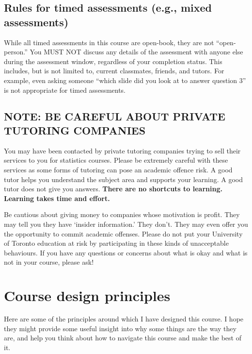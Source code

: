 \documentclass[
  openany]{book}
\begin{document}
\hypertarget{rules-for-timed-assessments-e.g.-mixed-assessments}{%
\subsection{Rules for timed assessments (e.g., mixed assessments)}\label{rules-for-timed-assessments-e.g.-mixed-assessments}}

While all timed assessments in this course are open-book, they are not ``open-person.'' You MUST NOT discuss any details of the assessment with anyone else during the assessment window, regardless of your completion status. This includes, but is not limited to, current classmates, friends, and tutors. For example, even asking someone ``which slide did you look at to answer question 3'' is not appropriate for timed assessments.

\hypertarget{note-be-careful-about-private-tutoring-companies}{%
\subsection{NOTE: BE CAREFUL ABOUT PRIVATE TUTORING COMPANIES}\label{note-be-careful-about-private-tutoring-companies}}

You may have been contacted by private tutoring companies trying to sell their services to you for statistics courses. Please be extremely careful with these services as some forms of tutoring can pose an academic offence risk. A good tutor helps you understand the subject area and supports your learning. A good tutor does not give you answers. \textbf{There are no shortcuts to learning. Learning takes time and effort.}

Be cautious about giving money to companies whose motivation is profit. They may tell you they have `insider information.' They don't. They may even offer you the opportunity to commit academic offenses. Please do not put your University of Toronto education at risk by participating in these kinds of unacceptable behaviours. If you have any questions or concerns about what is okay and what is not in your course, please ask!

\hypertarget{course-design-principles}{%
\section{Course design principles}\label{course-design-principles}}

Here are some of the principles around which I have designed this course. I hope they might provide some useful insight into why some things are the way they are, and help you think about how to navigate this course and make the best of it.
\end{document}
